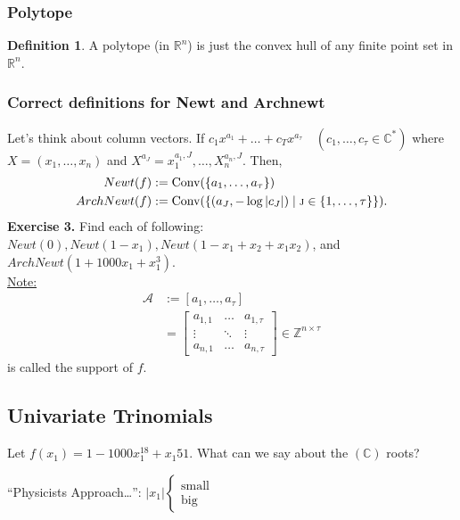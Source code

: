 \documentclass[]{article}
\theoremstyle{definition}
\newtheorem*{defn}{Definition}
\begin{document}
			\subsubsection{Polytope}
			\begin{defn}
			A polytope (in $\mathbb{R}^n$) is just the convex hull of any finite point set in $\mathbb{R}^n$.
			\end{defn}
			\subsubsection{Correct definitions for Newt and Archnewt}
			Let's think about column vectors. If $c_1x^{a_1}+\dots+c_Tx^{a_\tau} \quad (c_1,\dots,c_\tau \in \mathbb{C}^{*})$ where $X=(x_1,\dots,x_n)$ and $X^{a_{J}}=x_1^{a_1,J},\dots, X_n^{a_n,J}$. Then,
			\begin{align*}
			Newt(f) &: = \text{Conv}(\{a_1,\ldots,a_\tau\}) \\
			ArchNewt(f) &: = \text{Conv}(\{(a_J,-\log|c_J|) \mid \text{\scriptsize{J}} \in \{1,\ldots,\tau\}\}).
			\end{align*}
			\textbf{Exercise 3.} Find each of following: $Newt(0), Newt(1-x_1), Newt(1-x_1+x_2+x_1x_2)$, and $ArchNewt(1+1000x_1+x_1^3)$.
						\vspace{.25in}
			\\
			\underline{Note:} 
			\begin{align*}
			\mathcal{A} &:= [a_1,\ldots, a_\tau]\\
			&= \left[\begin{array}{ccc}a_{1,1} & \ldots & a_{1,\tau} \\\vdots & \ddots & \vdots \\a_{n,1} & \dots & a_{n,\tau}\end{array}\right] \in \mathbb{Z}^{n\times\tau}
			\end{align*}
			is called the support of $f$.
			\subsection{Univariate Trinomials}
			Let $f(x_1)=1-1000x_1^{18}+x_1{51}$. What can we say about the $(\mathbb{C})$ roots?
			
			\begin{center}``Physicists Approach\ldots'': $|x_1|
			\begin{cases}
			\text{small}\\
			\text{big}
			\end{cases}
			$\end{center}
			
\end{document}
